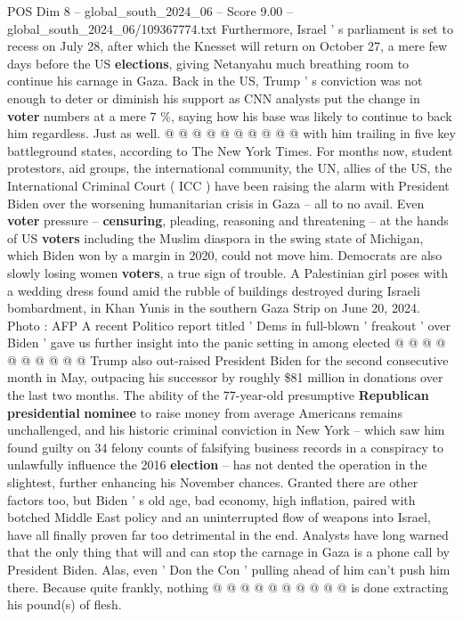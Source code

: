 \begin{textsample}{POS Dim 8 – global\_south\_2024\_06 – Score 9.00 – global\_south\_2024\_06/109367774.txt}
Furthermore, Israel ' s parliament is set to recess on July 28, after which the Knesset will return on October 27, a mere few days before the US \textbf{elections}, giving Netanyahu much breathing room to continue his carnage in Gaza.
Back in the US, Trump ' s conviction was not enough to deter or diminish his support as CNN analysts put the change in \textbf{voter} numbers at a mere 7 \%, saying how his base was likely to continue to back him regardless.
Just as well. @ @ @ @ @ @ @ @ @ @ with him trailing in five key battleground states, according to The New York Times.
For months now, student protestors, aid groups, the international community, the UN, allies of the US, the International Criminal Court ( ICC ) have been raising the alarm with President Biden over the worsening humanitarian crisis in Gaza -- all to no avail.
Even \textbf{voter} pressure -- \textbf{censuring}, pleading, reasoning and threatening -- at the hands of US \textbf{voters} including the Muslim diaspora in the swing state of Michigan, which Biden won by a margin in 2020, could not move him.
Democrats are also slowly losing women \textbf{voters}, a true sign of trouble.
A Palestinian girl poses with a wedding dress found amid the rubble of buildings destroyed during Israeli bombardment, in Khan Yunis in the southern Gaza Strip on June 20, 2024.
Photo : AFP A recent Politico report titled ' Dems in full-blown ' freakout ' over Biden ' gave us further insight into the panic setting in among elected @ @ @ @ @ @ @ @ @ @ Trump also out-raised President Biden for the second consecutive month in May, outpacing his successor by roughly \$81 million in donations over the last two months.
The ability of the 77-year-old presumptive \textbf{Republican} \textbf{presidential} \textbf{nominee} to raise money from average Americans remains unchallenged, and his historic criminal conviction in New York -- which saw him found guilty on 34 felony counts of falsifying business records in a conspiracy to unlawfully influence the 2016 \textbf{election} -- has not dented the operation in the slightest, further enhancing his November chances.
Granted there are other factors too, but Biden ' s old age, bad economy, high inflation, paired with botched Middle East policy and an uninterrupted flow of weapons into Israel, have all finally proven far too detrimental in the end.
Analysts have long warned that the only thing that will and can stop the carnage in Gaza is a phone call by President Biden.
Alas, even ' Don the Con ' pulling ahead of him can't push him there.
Because quite frankly, nothing @ @ @ @ @ @ @ @ @ @ is done extracting his pound(s) of flesh.

\end{textsample}
